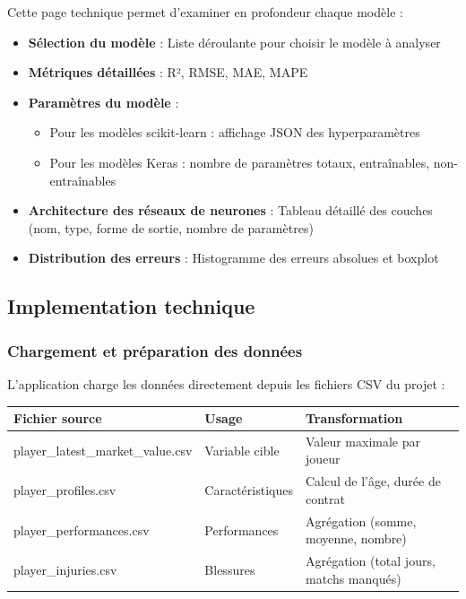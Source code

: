\documentclass[12pt,a4paper]{article}
\begin{document}

Cette page technique permet d'examiner en profondeur chaque modèle :

\begin{itemize}[leftmargin=*]
    \item \textbf{Sélection du modèle} : Liste déroulante pour choisir le modèle à analyser
    \item \textbf{Métriques détaillées} : R², RMSE, MAE, MAPE
    \item \textbf{Paramètres du modèle} :
    \begin{itemize}
        \item Pour les modèles scikit-learn : affichage JSON des hyperparamètres
        \item Pour les modèles Keras : nombre de paramètres totaux, entraînables, non-entraînables
    \end{itemize}
    \item \textbf{Architecture des réseaux de neurones} : Tableau détaillé des couches (nom, type, forme de sortie, nombre de paramètres)
    \item \textbf{Distribution des erreurs} : Histogramme des erreurs absolues et boxplot
\end{itemize}

\subsection{Implementation technique}

\subsubsection{Chargement et préparation des données}

L'application charge les données directement depuis les fichiers CSV du projet :

\begin{table}[H]
\centering
\begin{tabular}{@{}llp{6cm}@{}}
\toprule
\textbf{Fichier source} & \textbf{Usage} & \textbf{Transformation} \\ \midrule
player\_latest\_market\_value.csv & Variable cible & Valeur maximale par joueur \\
player\_profiles.csv & Caractéristiques & Calcul de l'âge, durée de contrat \\
player\_performances.csv & Performances & Agrégation (somme, moyenne, nombre) \\
player\_injuries.csv & Blessures & Agrégation (total jours, matchs manqués) \\ \bottomrule
\end{tabular}
\end{table}
\end{document}

